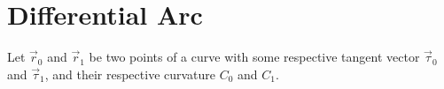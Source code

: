 \documentclass[11pt]{amsart}
\newcommand{\mymat}[1]{\mathbf{#1}}
\begin{document}
\section{Differential Arc}
Let $\vec{r}_0$ and $\vec{r}_1$ be two points of a curve
with some respective tangent vector $\vec{\tau}_0$ and $\vec{\tau}_1$, and their
respective curvature $C_0$ and $C_1$.
\end{document}

